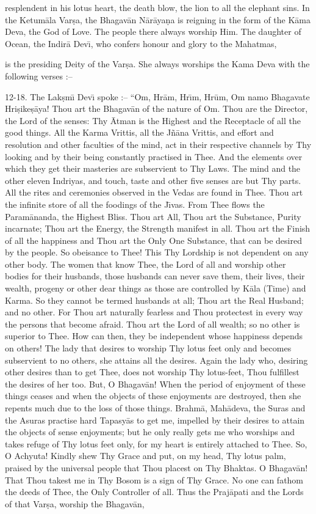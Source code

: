 resplendent in his lotus heart, the death blow, the lion to all the elephant sins. In the Ketum\=ala Var\d{s}a, the Bhagav\=an N\=ar\=aya\d{n}a is reigning in the form of the K\=ama Deva, the God of Love. The people there always worship Him. The daughter of Ocean, the Indir\=a Dev\={\i}, who confers honour and glory to the Mahatmas,

is the presiding Deity of the Var\d{s}a. She always worships the Kama Deva with the following verses :--

12-18. The Lak\d{s}m\={\i} Dev\={\i} spoke :-- ``Om, Hr\=am, Hr\={\i}m, Hr\=um, Om namo Bhagavate Hri\d{s}ike\d{s}\=aya! Thou art the Bhagav\=an of the nature of Om. Thou are the Director, the Lord of the senses: Thy \=Atman is the Highest and the Receptacle of all the good things. All the Karma Vrittis, all the J\~n\=ana Vrittis, and effort and resolution and other faculties of the mind, act in their respective channels by Thy looking and by their being constantly practised in Thee. And the elements over which they get their masteries are subservient to Thy Laws. The mind and the other eleven Indriyas, and touch, taste and other five senses are but Thy parts. All the rites and ceremonies observed in the Vedas are found in Thee. Thou art the infinite store of all the foodings of the J\={\i}vas. From Thee flows the Param\=ananda, the Highest Bliss. Thou art All, Thou art the Substance, Purity incarnate; Thou art the Energy, the Strength manifest in all. Thou art the Finish of all the happiness and Thou art the Only One Substance, that can be desired by the people. So obeisance to Thee! This Thy Lordship is not dependent on any other body. The women that know Thee, the Lord of all and worship other bodies for their husbands, those husbands can never save them, their lives, their wealth, progeny or other dear things as those are controlled by K\=ala (Time) and Karma. So they cannot be termed husbands at all; Thou art the Real Husband; and no other. For Thou art naturally fearless and Thou protectest in every way the persons that become afraid. Thou art the Lord of all wealth; so no other is superior to Thee. How can then, they be independent whose happiness depends on others! The lady that desires to worship Thy lotus feet only and becomes subservient to no others, she attains all the desires. Again the lady who, desiring other desires than to get Thee, does not worship Thy lotus-feet, Thou fulfillest the desires of her too. But, O Bhagav\=an! When the period of enjoyment of these things ceases and when the objects of these enjoyments are destroyed, then she repents much due to the loss of those things. Brahm\=a, Mah\=adeva, the Suras and the Asuras practise hard Tapasy\=as to get me, impelled by their desires to attain the objects of sense enjoyments; but he only really gets me who worships and takes refuge of Thy lotus feet only, for my heart is entirely attached to Thee. So, O Achyuta! Kindly shew Thy Grace and put, on my head, Thy lotus palm, praised by the universal people that Thou placest on Thy Bhaktas. O Bhagav\=an! That Thou takest me in Thy Bosom is a sign of Thy Grace. No one can fathom the deeds of Thee, the Only Controller of all. Thus the Praj\=apati and the Lords of that Var\d{s}a, worship the Bhagav\=an,


